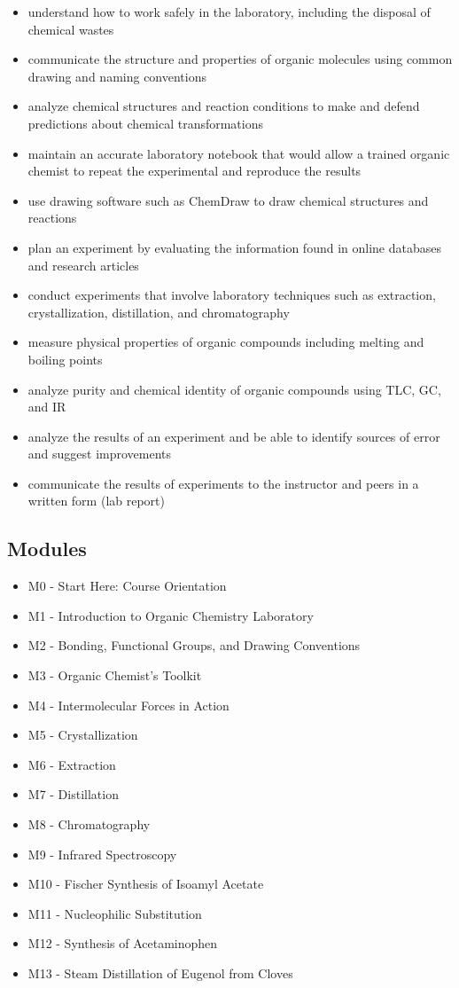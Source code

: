 \begin{itemize}
\tightlist
\item
  understand how to work safely in the laboratory, including the
  disposal of chemical wastes
\item
  communicate the structure and properties of organic molecules using
  common drawing and naming conventions
\item
  analyze chemical structures and reaction conditions to make and defend
  predictions about chemical transformations
\item
  maintain an accurate laboratory notebook that would allow a trained
  organic chemist to repeat the experimental and reproduce the results
\item
  use drawing software such as ChemDraw to draw chemical structures and
  reactions
\item
  plan an experiment by evaluating the information found in online
  databases and research articles
\item
  conduct experiments that involve laboratory techniques such as
  extraction, crystallization, distillation, and chromatography
\item
  measure physical properties of organic compounds including melting and
  boiling points
\item
  analyze purity and chemical identity of organic compounds using TLC,
  GC, and IR
\item
  analyze the results of an experiment and be able to identify sources
  of error and suggest improvements
\item
  communicate the results of experiments to the instructor and peers in
  a written form (lab report)
\end{itemize}

\hypertarget{modules}{%
\subsection{Modules}\label{modules}}

\begin{itemize}
\tightlist
\item
  M0 - Start Here: Course Orientation
\item
  M1 - Introduction to Organic Chemistry Laboratory
\item
  M2 - Bonding, Functional Groups, and Drawing Conventions
\item
  M3 - Organic Chemist's Toolkit
\item
  M4 - Intermolecular Forces in Action
\item
  M5 - Crystallization
\item
  M6 - Extraction
\item
  M7 - Distillation
\item
  M8 - Chromatography
\item
  M9 - Infrared Spectroscopy
\item
  M10 - Fischer Synthesis of Isoamyl Acetate
\item
  M11 - Nucleophilic Substitution
\item
  M12 - Synthesis of Acetaminophen
\item
  M13 - Steam Distillation of Eugenol from Cloves
\end{itemize}

